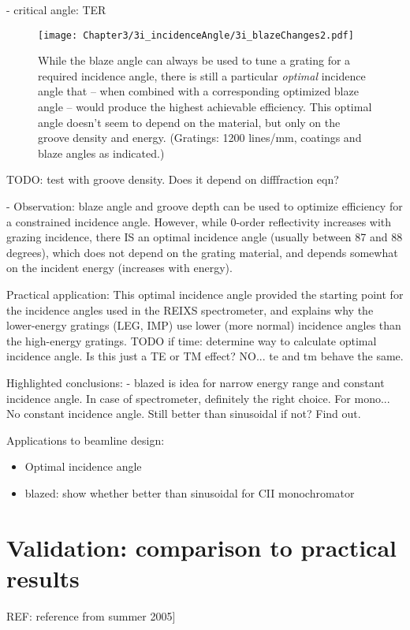 	- critical angle: TER
	
\begin{figure}[htbp] %
   \centering
   \texttt{[image: Chapter3/3i\_incidenceAngle/3i\_blazeChanges2.pdf]} 
   \caption{While the blaze angle can always be used to tune a grating for a required incidence angle, there is still a particular \emph{optimal} incidence angle that -- when combined with a corresponding optimized blaze angle -- would produce the highest achievable efficiency.  This optimal angle doesn't seem to depend on the material, but only on the groove density and energy.  (Gratings: 1200 lines/mm, coatings and blaze angles as indicated.)}
   \label{3i-2}
\end{figure}

TODO: test with groove density. Does it depend on difffraction eqn?
	
	- Observation: blaze angle and groove depth can be used to optimize efficiency for a constrained incidence angle.  However, while 0-order reflectivity increases with grazing incidence, there IS an optimal incidence angle (usually between 87 and 88 degrees), which does not depend on the grating material, and depends somewhat on the incident energy (increases with energy).  
	
	Practical application: This optimal incidence angle provided the starting point for the incidence angles used in the REIXS spectrometer, and explains why the lower-energy gratings (LEG, IMP) use lower (more normal) incidence angles than the high-energy gratings.
	TODO if time: determine way to calculate optimal incidence angle.  Is this just a TE or TM effect? NO... te and tm behave the same.
	
	
Highlighted conclusions:
	- blazed is idea for narrow energy range and constant incidence angle.  In case of spectrometer, definitely the right choice.  For mono... No constant incidence angle.  Still better than sinusoidal if not?  Find out.
	

	Applications to beamline design:
\begin{itemize}
\item Optimal incidence angle
\item blazed: show whether better than sinusoidal for CII monochromator
\end{itemize}

\section{Validation: comparison to practical results}
 REF:  reference from summer 2005]
 
